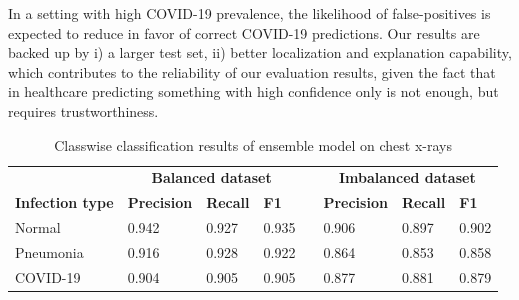 \documentclass[conference]{IEEEtran}
\begin{document}
In a setting with high COVID-19 prevalence, the likelihood of false-positives is expected to reduce in favor of correct COVID-19 predictions. Our results are backed up by i) a larger test set, ii) better localization and explanation capability, which contributes to the reliability of our evaluation results, given the fact that in healthcare predicting something with high confidence only is not enough, but requires trustworthiness. 

\begin{table}
    \centering
	\caption{Classwise classification results of ensemble model on chest x-rays}
	\label{Table:class_specific_result}
	\begin{tabular}{p{3.2cm}p{1.7cm}p{1.1cm}p{1.3cm}p{0.1cm}p{1.7cm}p{1.2cm}p{1.0cm}}
		 & \multicolumn{3}{c}{\textbf{Balanced dataset}} && \multicolumn{3}{c}{\textbf{Imbalanced dataset}} \\	
		\cmidrule{2-4}\cmidrule{6-8}
		\textbf{Infection type} & \textbf{Precision} & \textbf{Recall}& \textbf{F1}&& \textbf{Precision} & \textbf{Recall}& \textbf{F1}\\	
		\hline
		Normal & 0.942 & 0.927 & 0.935 && 0.906 & 0.897 & 0.902\\
		Pneumonia & 0.916 & 0.928 & 0.922 && 0.864 & 0.853 & 0.858\\
		COVID-19 & 0.904 & 0.905 & 0.905 && 0.877 & 0.881 & 0.879\\
		\hline
	\end{tabular}
	\vspace{-4mm}
\end{table}
\end{document}
